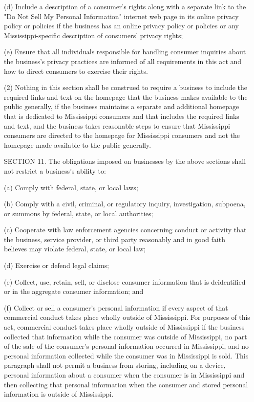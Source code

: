           (d)  Include a description of a consumer's rights along with a separate link to the "Do Not Sell My Personal Information" internet web page in its online privacy policy or policies if the business has an online privacy policy or policies or any Mississippi-specific description of consumers' privacy rights;

          (e)  Ensure that all individuals responsible for handling consumer inquiries about the business's privacy practices are informed of all requirements in this act and how to direct consumers to exercise their rights.

     (2)  Nothing in this section shall be construed to require a business to include the required links and text on the homepage that the business makes available to the public generally, if the business maintains a separate and additional homepage that is dedicated to Mississippi consumers and that includes the required links and text, and the business takes reasonable steps to ensure that Mississippi consumers are directed to the homepage for Mississippi consumers and not the homepage made available to the public generally.

     SECTION 11.  The obligations imposed on businesses by the above sections shall not restrict a business's ability to:

          (a)  Comply with federal, state, or local laws;

          (b)  Comply with a civil, criminal, or regulatory inquiry, investigation, subpoena, or summons by federal, state, or local authorities;

          (c)  Cooperate with law enforcement agencies concerning conduct or activity that the business, service provider, or third party reasonably and in good faith believes may violate federal, state, or local law;

          (d)  Exercise or defend legal claims;

          (e)  Collect, use, retain, sell, or disclose consumer information that is deidentified or in the aggregate consumer information; and

          (f)  Collect or sell a consumer's personal information if every aspect of that commercial conduct takes place wholly outside of Mississippi.  For purposes of this act, commercial conduct takes place wholly outside of Mississippi if the business collected that information while the consumer was outside of Mississippi, no part of the sale of the consumer's personal information occurred in Mississippi, and no personal information collected while the consumer was in Mississippi is sold.  This paragraph shall not permit a business from storing, including on a device, personal information about a consumer when the consumer is in Mississippi and then collecting that personal information when the consumer and stored personal information is outside of Mississippi.

